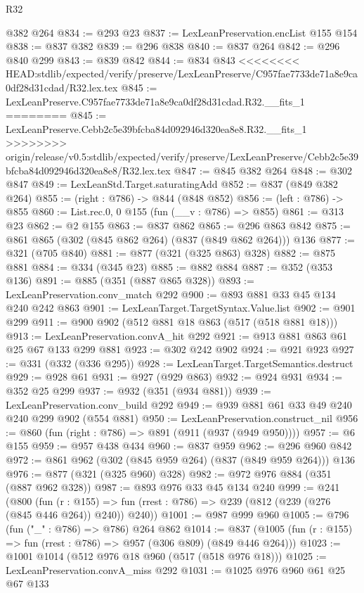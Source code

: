 \begin{lexlean}{R32}
\begin{coremodule}
{{{{{{{{{{{{    @382
    @264
@834 := @293 @23
@837 := LexLeanPreservation.encList @155 @154
@838 := @837 @382
@839 := @296 @838
@840 := @837 @264
@842 := @296 @840 @299
@843 := @839 @842
@844 := @834 @843
<<<<<<<< HEAD:stdlib/expected/verify/preserve/LexLeanPreserve/C957fae7733de71a8e9ca0df28d31cdad/R32.lex.tex
@845 := LexLeanPreserve.C957fae7733de71a8e9ca0df28d31cdad.R32.__fits_1
========
@845 := LexLeanPreserve.Cebb2c5e39bfcba84d092946d320ea8e8.R32.__fits_1
>>>>>>>> origin/release/v0.5:stdlib/expected/verify/preserve/LexLeanPreserve/Cebb2c5e39bfcba84d092946d320ea8e8/R32.lex.tex
@847 := @845 @382 @264
@848 := @302 @847
@849 := LexLeanStd.Target.saturatingAdd
@852 := @837 (@849 @382 @264)
@855 := (right : @786) -> @844 (@848 @852)
@856 := (left : @786) -> @855
@860 := List.rec.{0, 0} @155 (fun (__v : @786) => @855)
@861 := @313 @23
@862 := @2 @155
@863 := @837 @862
@865 := @296 @863 @842
@875 := @861 @865 (@302 (@845 @862 @264) (@837 (@849 @862 @264))) @136
@877 := @321 (@705 @840)
@881 := @877 (@321 (@325 @863) @328)
@882 := @875 @881
@884 := @334 (@345 @23)
@885 := @882 @884
@887 := @352 (@353 @136)
@891 := @885 (@351 (@887 @865 @328))
@893 := LexLeanPreservation.conv_match @292
@900 := @893 @881 @33 @45 @134 @240 @242 @863
@901 := LexLeanTarget.TargetSyntax.Value.list
@902 := @901 @299
@911 := @900 @902 (@512 @881 @18 @863 (@517 (@518 @881 @18)))
@913 := LexLeanPreservation.convA_hit @292
@921 := @913 @881 @863 @61 @25 @67 @133 @299 @881
@923 := @302 @242 @902
@924 := @921 @923
@927 := @331 (@332 (@336 @295))
@928 := LexLeanTarget.TargetSemantics.destruct
@929 := @928 @61
@931 := @927 (@929 @863)
@932 := @924 @931
@934 := @352 @25 @299
@937 := @932 (@351 (@934 @881))
@939 := LexLeanPreservation.conv_build @292
@949 := @939 @881 @61 @33 @49 @240 @240 @299 @902 (@554 @881)
@950 := LexLeanPreservation.construct_nil
@956 := @860 (fun (right : @786) => @891 (@911 (@937 (@949 @950))))
@957 := @6 @155
@959 := @957 @438 @434
@960 := @837 @959
@962 := @296 @960 @842
@972 := @861 @962 (@302 (@845 @959 @264) (@837 (@849 @959 @264))) @136
@976 := @877 (@321 (@325 @960) @328)
@982 := @972 @976 @884 (@351 (@887 @962 @328))
@987 := @893 @976 @33 @45 @134 @240
@999 := @241
    (@800
      (fun (r : @155) =>
      fun (rrest : @786) => @239 (@812 (@239 (@276 (@845 @446 @264)) @240)) @240))
@1001 := @987 @999 @960
@1005 := @796 (fun ("_" : @786) => @786) @264 @862
@1014 := @837 (@1005 (fun (r : @155) => fun (rrest : @786) => @957 (@306 @809) (@849 @446 @264)))
@1023 := @1001 @1014 (@512 @976 @18 @960 (@517 (@518 @976 @18)))
@1025 := LexLeanPreservation.convA_miss @292
@1031 := @1025 @976 @960 @61 @25 @67 @133
}}}}}}}}}}}}
\end{coremodule}
\end{lexlean}
